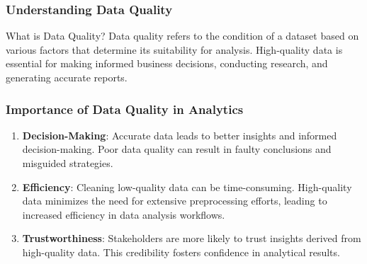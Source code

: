 \documentclass[aspectratio=169]{beamer}
\begin{document}
\begin{frame}[fragile]
    \frametitle{Understanding Data Quality}
    \begin{block}{What is Data Quality?}
        Data quality refers to the condition of a dataset based on various factors that determine its suitability for analysis. High-quality data is essential for making informed business decisions, conducting research, and generating accurate reports.
    \end{block}
\end{frame}

\begin{frame}[fragile]
    \frametitle{Importance of Data Quality in Analytics}
    \begin{enumerate}
        \item \textbf{Decision-Making}: Accurate data leads to better insights and informed decision-making. Poor data quality can result in faulty conclusions and misguided strategies.
        \item \textbf{Efficiency}: Cleaning low-quality data can be time-consuming. High-quality data minimizes the need for extensive preprocessing efforts, leading to increased efficiency in data analysis workflows.
        \item \textbf{Trustworthiness}: Stakeholders are more likely to trust insights derived from high-quality data. This credibility fosters confidence in analytical results.
    \end{enumerate}
\end{frame}
\end{document}
